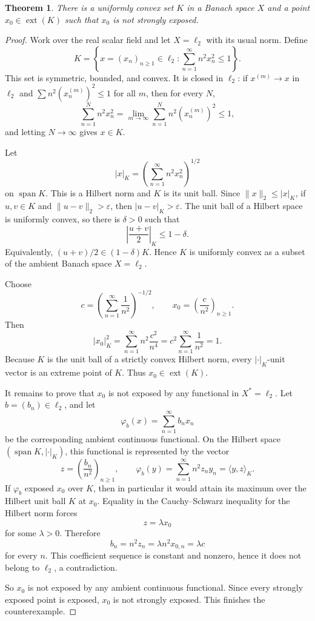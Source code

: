 \documentclass[11pt]{article}
\newtheorem{theorem}{Theorem}
\newcommand{\ellTwo}{\ell_2}
\begin{document}
\begin{theorem}
There is a uniformly convex set \(K\) in a Banach space \(X\) and a point
\(x_0\in \operatorname{ext}(K)\) such that \(x_0\) is not strongly exposed.
\end{theorem}

\begin{proof}
Work over the real scalar field and let \(X=\ellTwo\) with its usual norm.
Define
\[
  K=\left\{x=(x_n)_{n\ge 1}\in \ellTwo:
    \sum_{n=1}^{\infty} n^2 x_n^2\le 1\right\}.
\]
This set is symmetric, bounded, and convex. It is closed in \(\ellTwo\):
if \(x^{(m)}\to x\) in \(\ellTwo\) and
\(\sum n^2 (x_n^{(m)})^2\le 1\) for all \(m\), then for every \(N\),
\[
  \sum_{n=1}^N n^2x_n^2
   =\lim_{m\to\infty}\sum_{n=1}^N n^2 (x_n^{(m)})^2
   \le 1,
\]
and letting \(N\to\infty\) gives \(x\in K\).

Let
\[
  |x|_K=\left(\sum_{n=1}^{\infty}n^2x_n^2\right)^{1/2}
\]
on \(\operatorname{span}K\). This is a Hilbert norm and \(K\) is its unit ball.
Since \(\|x\|_2\le |x|_K\), if \(u,v\in K\) and \(\|u-v\|_2>\varepsilon\), then
\(|u-v|_K>\varepsilon\). The unit ball of a Hilbert space is uniformly convex,
so there is \(\delta>0\) such that
\[
  \left|\frac{u+v}{2}\right|_K\le 1-\delta.
\]
Equivalently, \((u+v)/2\in (1-\delta)K\). Hence \(K\) is uniformly convex as a
subset of the ambient Banach space \(X=\ellTwo\).

Choose
\[
  c=\left(\sum_{n=1}^{\infty}\frac1{n^2}\right)^{-1/2},
  \qquad
  x_0=\left(\frac{c}{n^2}\right)_{n\ge 1}.
\]
Then
\[
  |x_0|_K^2=\sum_{n=1}^{\infty}n^2\frac{c^2}{n^4}
  =c^2\sum_{n=1}^{\infty}\frac1{n^2}=1.
\]
Because \(K\) is the unit ball of a strictly convex Hilbert norm, every
\(|\cdot|_K\)-unit vector is an extreme point of \(K\). Thus
\(x_0\in\operatorname{ext}(K)\).

It remains to prove that \(x_0\) is not exposed by any functional in
\(X^*=\ellTwo\). Let \(b=(b_n)\in\ellTwo\), and let
\[
  \varphi_b(x)=\sum_{n=1}^{\infty}b_nx_n
\]
be the corresponding ambient continuous functional. On the Hilbert space
\((\operatorname{span}K,|\cdot|_K)\), this functional is represented by the
vector
\[
  z=\left(\frac{b_n}{n^2}\right)_{n\ge 1},
  \qquad
  \varphi_b(y)=\sum_{n=1}^{\infty}n^2 z_n y_n
  =\langle y,z\rangle_K .
\]
If \(\varphi_b\) exposed \(x_0\) over \(K\), then in particular it would attain
its maximum over the Hilbert unit ball \(K\) at \(x_0\). Equality in the
Cauchy--Schwarz inequality for the Hilbert norm forces
\[
  z=\lambda x_0
\]
for some \(\lambda>0\). Therefore
\[
  b_n=n^2z_n=\lambda n^2x_{0,n}=\lambda c
\]
for every \(n\). This coefficient sequence is constant and nonzero, hence it
does not belong to \(\ellTwo\), a contradiction.

So \(x_0\) is not exposed by any ambient continuous functional. Since every
strongly exposed point is exposed, \(x_0\) is not strongly exposed. This
finishes the counterexample.
\end{proof}
\end{document}
